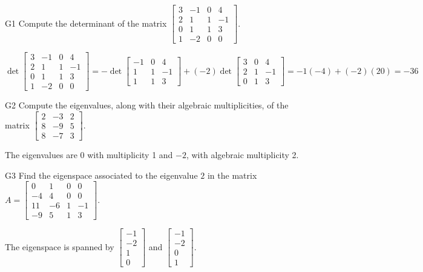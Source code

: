 \documentclass{sbgLAsemi}
\begin{document}
\begin{problem}{G1}
Compute the determinant of the matrix $\begin{bmatrix} 3 & -1 & 0 & 4 \\ 2 & 1 & 1& -1 \\ 0 & 1 & 1 & 3 \\ 1 & -2 & 0 & 0 \end{bmatrix}$.
\end{problem}
\begin{solution}
$$\det \begin{bmatrix} 3 & -1 & 0 & 4 \\ 2 & 1 & 1 &-1 \\ 0 & 1 & 1 & 3 \\ 1 & -2 & 0 & 0 \end{bmatrix} = -\det \begin{bmatrix} -1 & 0 & 4 \\ 1 & 1 & -1 \\ 1 & 1 & 3 \end{bmatrix} +(-2) \det \begin{bmatrix} 3 & 0 & 4 \\ 2 & 1 & -1 \\ 0 & 1 & 3 \end{bmatrix} = -1(-4)+(-2)(20) = -36$$
\end{solution}

\begin{problem}{G2} 
Compute the eigenvalues, along with their algebraic multiplicities, of the matrix $ \begin{bmatrix}2 & -3 & 2 \\ 8 & -9 & 5 \\ 8 & -7 & 3 \end{bmatrix}$.
\end{problem}
\begin{solution}
The eigenvalues are $0$ with multiplicity 1 and $-2$, with algebraic multiplicity 2.
\end{solution}

\begin{problem}{G3}
Find the eigenspace associated to the eigenvalue $2$ in the matrix $A=\begin{bmatrix} 0 & 1 & 0 & 0 \\ -4 & 4 & 0 & 0 \\ 11 & -6 & 1 & -1 \\ -9 & 5 & 1 & 3 \end{bmatrix}$.
\end{problem}
\begin{solution}
The eigenspace is spanned by $\begin{bmatrix} -1 \\ -2 \\ 1 \\ 0 \end{bmatrix}$ and $\begin{bmatrix} -1 \\ -2 \\ 0 \\ 1 \end{bmatrix}$.
\end{solution}
\end{document}
